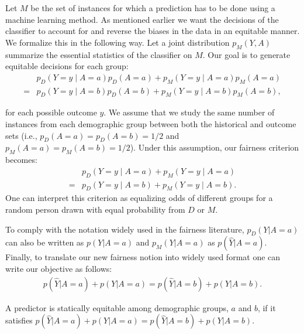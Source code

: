 Let $M$ be the set of instances for which a prediction has to be done using a machine learning method.
As mentioned earlier we want the decisions of the classifier to account for and reverse the biases in the data in an equitable manner.
We formalize this in the following way.
Let a joint distribution $p_M(Y, A)$ summarize the essential statistics of the classifier on $M$.
Our goal is to generate equitable decisions for each group:
\begin{align*}
&p_D(Y=y \mid A=a) p_D(A=a) + p_M(Y = y \mid A=a) p_M(A=a)\\ 
=&p_D(Y=y \mid A=b) p_D(A=b) + p_M(Y = y \mid A=b) p_M(A=b), 
\end{align*}

for each possible outcome $y$.
We assume that we study the same number of instances from each demographic group between both the historical and outcome sets (i.e., $p_D(A = a) = p_D(A = b) = 1/2$ and $p_M(A=a)=p_M(A=b)=1/2$).
Under this assumption, our fairness criterion becomes:
\begin{align*}
&p_D(Y=y \mid A=a) + p_M(Y = y \mid A=a)\\ 
=&p_D(Y=y \mid A=b)  + p_M(Y = y \mid A=b). 
\end{align*}
One can interpret this criterion as equalizing odds of different groups for a random person drawn with equal probability from $D$ or $M$.

To comply with the notation widely used in the fairness literature,  $p_D(Y | A=a)$ can also be written as $p(Y|A=a)$ and $p_M(Y| A=a)$ as $p(\hat{Y}| A=a)$.\\
Finally, to translate our new fairness notion into widely used format one can write our objective as follows:
\begin{align*}
    p(\hat{Y}|A=a)+p(Y|A=a)=p(\hat{Y}|A=b)+p(Y|A=b).
\end{align*}
\begin{tcolorbox}
\begin{definition} 
  A predictor is statically equitable among demographic groups, $a$ and $b$, if it satisfies $p(\hat{Y}|A=a)+p(Y|A=a)=p(\hat{Y}|A=b)+p(Y|A=b)$.
\end{definition}
\end{tcolorbox}




